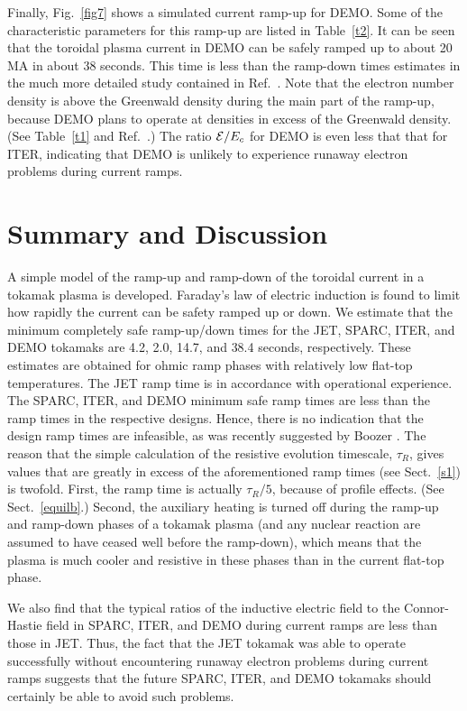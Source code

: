 \documentclass{iopjournal}
\begin{document}
Finally, Fig.~\ref{fig7} shows a simulated current ramp-up for DEMO. Some of the characteristic  parameters for this ramp-up are listed in Table~\ref{t2}. 
It can be seen that the toroidal plasma current in DEMO can be safely ramped up to about 20 MA in about 38 seconds. This time is less than the ramp-down times estimates in the much more detailed study contained in Ref.~\cite{mul}. Note that the electron number density is above the Greenwald
density during the main part of the ramp-up, because DEMO plans to operate at densities in excess of the Greenwald density. (See Table~\ref{t1} and Ref.~\cite{demo}.) The ratio ${\cal E}/E_c$
for DEMO is even less that that for ITER, indicating that DEMO is unlikely to experience runaway electron problems during current ramps. 

\section{Summary and Discussion}
A simple model of the ramp-up and ramp-down of the toroidal current in a tokamak plasma is developed. Faraday's law of electric induction is found to 
limit how rapidly the current can be safety ramped up or down. We estimate that the minimum completely safe ramp-up/down times for the JET, SPARC, 
ITER, and DEMO tokamaks are 4.2, 2.0, 14.7, and 38.4 seconds, respectively. These estimates are obtained for ohmic ramp phases with relatively low
flat-top temperatures. The JET ramp time is in accordance with operational experience. The SPARC, ITER, and DEMO minimum safe ramp times are less than the ramp times in the respective designs. Hence, there is no indication that the design ramp times are infeasible, as was recently 
suggested by Boozer \cite{boozer,boozera}. The reason that the simple calculation of the resistive evolution timescale, $\tau_R$, gives values that are greatly in
excess of the aforementioned ramp times (see Sect.~\ref{s1}) is twofold. First, the ramp time is actually $\tau_R/5$, because of profile effects. (See Sect.~\ref{equilb}.) Second, the auxiliary heating is turned
off during the ramp-up and ramp-down phases of a tokamak plasma (and any nuclear reaction are assumed to have ceased well before the ramp-down), which means that the plasma is much cooler and resistive in these phases than in the current flat-top phase.  

We also find that the typical ratios of the inductive electric field
to the Connor-Hastie field in SPARC, ITER, and DEMO during current ramps are less than those in JET. Thus, the fact that the JET tokamak was able to operate successfully
without encountering runaway electron problems during  current ramps suggests that the future SPARC, ITER, and DEMO tokamaks should certainly be able to
avoid such problems. 
\end{document}
